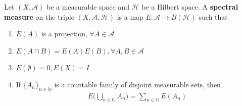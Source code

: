\begin{definition}
  Let $(X, \mathcal{A})$ be a measurable space and $\mathcal{H}$ be a
  Hilbert space. A \textbf{spectral measure} on the triple $(X, \mathcal{A},
  \mathcal{H})$ is a map $E : \mathcal{A} \to  B(\mathcal{H})$ such that
  \begin{enumerate}[label=(\arabic*)]
    \item $E(A)$ is a projection, $\forall A \in \mathcal{A}$
    \item $E(A \cap B) = E(A)E(B), \forall A, B \in \mathcal{A}$
    \item $E(\emptyset) = 0, E(X) = I$
    \item If $\{ A_n \}_{n \in \mathbb{N}}$ is a countable family of
      disjoint measurable sets, then
      \begin{align*}
        E \Big( \bigcup_{n \in \mathbb{N}}A_n \Big) = \sum_{n \in
        \mathbb{N}} E(A_n)
      \end{align*}
  \end{enumerate}
\end{definition}
